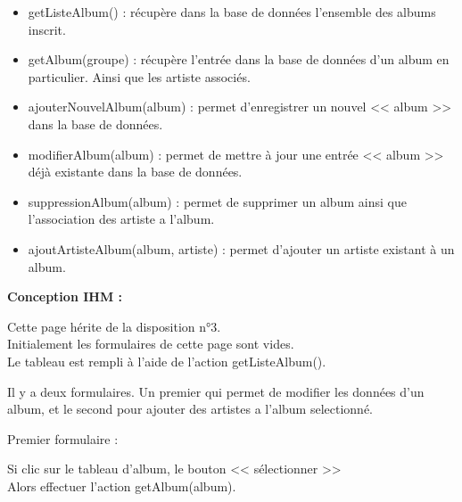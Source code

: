 			\begin{paragraphe}
				\begin{itemize}
					\item getListeAlbum() : récupère dans la base de données l'ensemble des albums inscrit.
					\item getAlbum(groupe) : récupère l'entrée dans la base de données d'un album en particulier. Ainsi que les artiste associés.
					\item ajouterNouvelAlbum(album) : permet d'enregistrer un nouvel << album >> dans la base de données.
					\item modifierAlbum(album) : permet de mettre à jour une entrée << album >> déjà existante dans la base de données.
					\item suppressionAlbum(album) : permet de supprimer un album ainsi que l'association des artiste a l'album.
					\item ajoutArtisteAlbum(album, artiste) : permet d'ajouter un artiste existant à un album.
				\end{itemize}
			\end{paragraphe}

			\begin{paragraphe}
				\textbf{Conception IHM :}
			\end{paragraphe}

			\begin{paragraphe}
				Cette page hérite de la disposition n°3. \\
				Initialement les formulaires de cette page sont vides. \\
				Le tableau est rempli à l'aide de l'action getListeAlbum().
			\end{paragraphe}


			\begin{paragraphe}
				Il y a deux formulaires. Un premier qui permet de modifier les données d'un album, et le second pour ajouter des artistes a l'album selectionné.
			\end{paragraphe}

			\begin{paragraphe}
				Premier formulaire :
			\end{paragraphe}

			\begin{paragraphe}
				Si clic sur le tableau d'album, le bouton << sélectionner >> \\
				Alors effectuer l'action getAlbum(album).
			\end{paragraphe}

